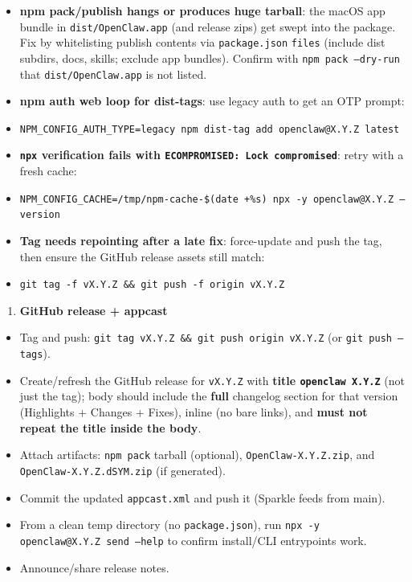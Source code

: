 \begin{itemize}
  \item \textbf{npm pack/publish hangs or produces huge tarball}: the macOS app bundle in \texttt{dist/OpenClaw.app} (and release zips) get swept into the package. Fix by whitelisting publish contents via \texttt{package.json} \texttt{files} (include dist subdirs, docs, skills; exclude app bundles). Confirm with \texttt{npm pack --dry-run} that \texttt{dist/OpenClaw.app} is not listed.
  \item \textbf{npm auth web loop for dist-tags}: use legacy auth to get an OTP prompt:
  \item \texttt{NPM\_CONFIG\_AUTH\_TYPE=legacy npm dist-tag add openclaw@X.Y.Z latest}
  \item \textbf{\texttt{npx} verification fails with \texttt{ECOMPROMISED: Lock compromised}}: retry with a fresh cache:
  \item \texttt{NPM\_CONFIG\_CACHE=/tmp/npm-cache-\$(date +\%s) npx -y openclaw@X.Y.Z --version}
  \item \textbf{Tag needs repointing after a late fix}: force-update and push the tag, then ensure the GitHub release assets still match:
  \item \texttt{git tag -f vX.Y.Z \&\& git push -f origin vX.Y.Z}
\end{itemize}


\begin{enumerate}
  \item \textbf{GitHub release + appcast}
\end{enumerate}


\begin{itemize}
  \item [ ] Tag and push: \texttt{git tag vX.Y.Z \&\& git push origin vX.Y.Z} (or \texttt{git push --tags}).
  \item [ ] Create/refresh the GitHub release for \texttt{vX.Y.Z} with \textbf{title \texttt{openclaw X.Y.Z}} (not just the tag); body should include the \textbf{full} changelog section for that version (Highlights + Changes + Fixes), inline (no bare links), and \textbf{must not repeat the title inside the body}.
  \item [ ] Attach artifacts: \texttt{npm pack} tarball (optional), \texttt{OpenClaw-X.Y.Z.zip}, and \texttt{OpenClaw-X.Y.Z.dSYM.zip} (if generated).
  \item [ ] Commit the updated \texttt{appcast.xml} and push it (Sparkle feeds from main).
  \item [ ] From a clean temp directory (no \texttt{package.json}), run \texttt{npx -y openclaw@X.Y.Z send --help} to confirm install/CLI entrypoints work.
  \item [ ] Announce/share release notes.
\end{itemize}


